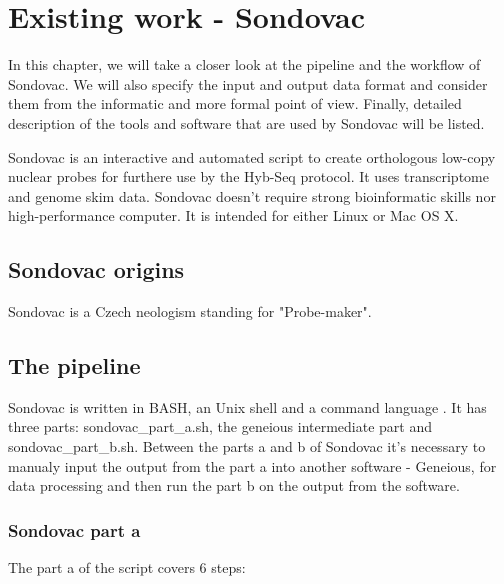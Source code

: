 \chapter[Existing work - Sondovac]{Existing work - Sondovac}
\label{kap:existing_work}

In this chapter, we will take a closer look at the pipeline and the workflow of Sondovac. We 
will also specify the input and output data format and consider them from the informatic and 
more formal point of view. Finally, detailed description of the tools and software that are used by 
Sondovac will be listed. 

Sondovac is an interactive and automated script to create orthologous low-copy nuclear 
probes for furthere use by the Hyb-Seq protocol. It uses transcriptome and genome skim data. 
Sondovac doesn't require strong bioinformatic skills nor high-performance computer. It is 
intended for either Linux or Mac OS X. 



\section{Sondovac origins}

Sondovac is a Czech neologism standing for "Probe-maker". 

\section{The pipeline}

Sondovac is written in BASH, an Unix shell and a command language \cite{bash}. It has three 
parts: sondovac\_part\_a.sh, the geneious intermediate part and sondovac\_part\_b.sh. Between 
the parts a and b of Sondovac it's necessary to manualy input the output from the part a into 
another software - Geneious, for data processing and then run the part b on the output from the software. 

\subsection{Sondovac part a}%

The part a of the script covers 6 steps: 

